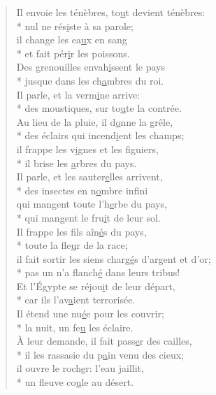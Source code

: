 \begin{verse}
Il envoie les ténèbres, to\underline{u}t devient ténèbres: \\*
nul ne rés\underline{i}ste à sa parole; \\
il change les ea\underline{u}x en sang \\*
et fait pér\underline{i}r les poissons. \\

Des grenouilles envah\underline{i}ssent le pays \\*
jusque dans les ch\underline{a}mbres du roi. \\
Il parle, et la verm\underline{i}ne arrive: \\*
des moustiques, sur to\underline{u}te la contrée. \\

Au lieu de la pluie, il d\underline{o}nne la grêle, \\*
des éclairs qui incend\underline{i}ent les champs; \\
il frappe les v\underline{i}gnes et les figuiers, \\*
il brise les \underline{a}rbres du pays. \\

Il parle, et les sauter\underline{e}lles arrivent, \\*
des insectes en n\underline{o}mbre infini \\
qui mangent toute l’h\underline{e}rbe du pays, \\*
qui mangent le fru\underline{i}t de leur sol. \\

Il frappe les fils aîn\underline{é}s du pays, \\*
toute la fle\underline{u}r de la race; \\
il fait sortir les siens charg\underline{é}s d’argent et d’or; \\*
pas un n’a flanch\underline{é} dans leurs tribus! \\
Et l’Égypte se réjou\underline{i}t de leur départ, \\*
car ils l’av\underline{a}ient terrorisée. \\

Il étend une nu\underline{é}e pour les couvrir; \\*
la nuit, un fe\underline{u} les éclaire. \\
À leur demande, il fait pass\underline{e}r des cailles, \\*
il les rassasie du p\underline{a}in venu des cieux; \\
il ouvre le roch\underline{e}r: l’eau jaillit, \\*
un fleuve co\underline{u}le au désert. \\


\end{verse}
